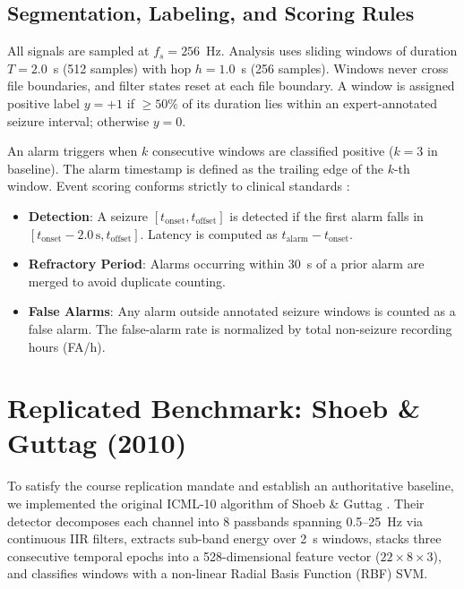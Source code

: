 \documentclass[10pt,twocolumn,letterpaper]{article}
\begin{document}
\subsection{Segmentation, Labeling, and Scoring Rules}
All signals are sampled at $f_s = 256$~Hz. Analysis uses sliding windows of duration $T = 2.0$~s (512 samples) with hop $h = 1.0$~s (256 samples). Windows never cross file boundaries, and filter states reset at each file boundary. 
A window is assigned positive label $y = +1$ if $\ge 50\%$ of its duration lies within an expert-annotated seizure interval; otherwise $y = 0$.

An alarm triggers when $k$ consecutive windows are classified positive ($k=3$ in baseline). The alarm timestamp is defined as the trailing edge of the $k$-th window. 
Event scoring conforms strictly to clinical standards \cite{shoeb2010icml}:
\begin{itemize}
    \item \textbf{Detection}: A seizure $[t_{\text{onset}}, t_{\text{offset}}]$ is detected if the first alarm falls in $[t_{\text{onset}} - 2.0\,\text{s}, t_{\text{offset}}]$. Latency is computed as $t_{\text{alarm}} - t_{\text{onset}}$.
    \item \textbf{Refractory Period}: Alarms occurring within 30~s of a prior alarm are merged to avoid duplicate counting.
    \item \textbf{False Alarms}: Any alarm outside annotated seizure windows is counted as a false alarm. The false-alarm rate is normalized by total non-seizure recording hours (FA/h).
\end{itemize}

\section{Replicated Benchmark: Shoeb \& Guttag (2010)}
\label{sec:replication}

To satisfy the course replication mandate and establish an authoritative baseline, we implemented the original ICML-10 algorithm of Shoeb \& Guttag \cite{shoeb2010icml}. Their detector decomposes each channel into 8 passbands spanning 0.5--25~Hz via continuous IIR filters, extracts sub-band energy over 2~s windows, stacks three consecutive temporal epochs into a 528-dimensional feature vector ($22 \times 8 \times 3$), and classifies windows with a non-linear Radial Basis Function (RBF) SVM.
\end{document}
